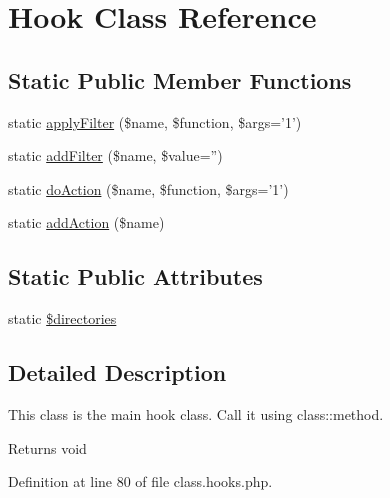 \hypertarget{class_hook}{\section{Hook Class Reference}
\label{class_hook}
}
\subsection*{Static Public Member Functions}
\begin{DoxyCompactItemize}
\item 
static \hyperlink{class_hook_aae875eca0ec73f226ce615840f06d161}{apply\-Filter} (\$name, \$function, \$args='1')
\item 
static \hyperlink{class_hook_a6489ed6b12329279b9e7cae26afc4dd6}{add\-Filter} (\$name, \$value='')
\item 
static \hyperlink{class_hook_a044e40a84df383f73df2250624d13c42}{do\-Action} (\$name, \$function, \$args='1')
\item 
static \hyperlink{class_hook_afff7a7869d2dd304043b69a3fff24655}{add\-Action} (\$name)
\end{DoxyCompactItemize}
\subsection*{Static Public Attributes}
\begin{DoxyCompactItemize}
\item 
static \hyperlink{class_hook_aca1cfea95d9874525c94ddc586b87633}{\$directories}
\end{DoxyCompactItemize}


\subsection{Detailed Description}
This class is the main hook class. Call it using class\-::method. 
 \begin{DoxyReturn}{Returns}
void 
\end{DoxyReturn}


Definition at line 80 of file class.\-hooks.\-php.



